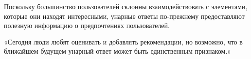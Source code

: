 Поскольку большинство пользователей склонны взаимодействовать с элементами, которые они находят интересными, унарные ответы по-прежнему предоставляют полезную информацию о предпочтениях пользователей.

«Сегодня люди любят оценивать и добавлять рекомендации, но возможно, что в ближайшем будущем унарный ответ может быть единственным признаком.»







